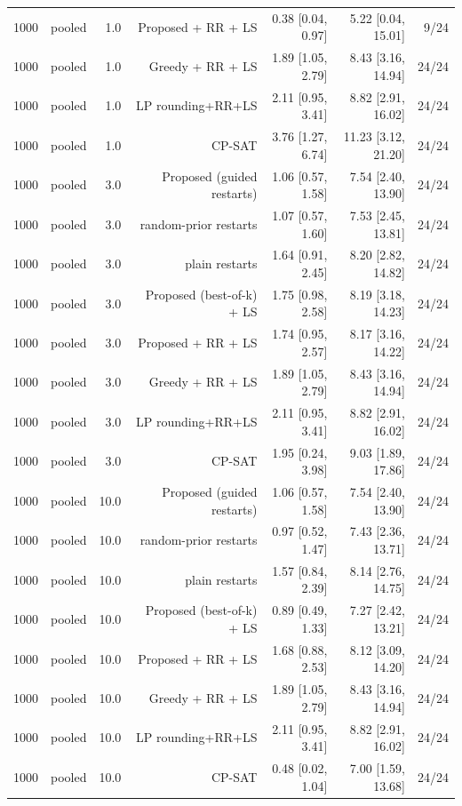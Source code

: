 \begin{table}[t]
\begin{tabular}{llrrrrr}
1000 & pooled & 1.0 & Proposed + RR + LS & 0.38 [0.04, 0.97] & 5.22 [0.04, 15.01] & 9/24 \\
1000 & pooled & 1.0 & Greedy + RR + LS & 1.89 [1.05, 2.79] & 8.43 [3.16, 14.94] & 24/24 \\
1000 & pooled & 1.0 & LP rounding+RR+LS & 2.11 [0.95, 3.41] & 8.82 [2.91, 16.02] & 24/24 \\
1000 & pooled & 1.0 & CP-SAT & 3.76 [1.27, 6.74] & 11.23 [3.12, 21.20] & 24/24 \\
1000 & pooled & 3.0 & Proposed (guided restarts) & 1.06 [0.57, 1.58] & 7.54 [2.40, 13.90] & 24/24 \\
1000 & pooled & 3.0 & random-prior restarts & 1.07 [0.57, 1.60] & 7.53 [2.45, 13.81] & 24/24 \\
1000 & pooled & 3.0 & plain restarts & 1.64 [0.91, 2.45] & 8.20 [2.82, 14.82] & 24/24 \\
1000 & pooled & 3.0 & Proposed (best-of-k) + LS & 1.75 [0.98, 2.58] & 8.19 [3.18, 14.23] & 24/24 \\
1000 & pooled & 3.0 & Proposed + RR + LS & 1.74 [0.95, 2.57] & 8.17 [3.16, 14.22] & 24/24 \\
1000 & pooled & 3.0 & Greedy + RR + LS & 1.89 [1.05, 2.79] & 8.43 [3.16, 14.94] & 24/24 \\
1000 & pooled & 3.0 & LP rounding+RR+LS & 2.11 [0.95, 3.41] & 8.82 [2.91, 16.02] & 24/24 \\
1000 & pooled & 3.0 & CP-SAT & 1.95 [0.24, 3.98] & 9.03 [1.89, 17.86] & 24/24 \\
1000 & pooled & 10.0 & Proposed (guided restarts) & 1.06 [0.57, 1.58] & 7.54 [2.40, 13.90] & 24/24 \\
1000 & pooled & 10.0 & random-prior restarts & 0.97 [0.52, 1.47] & 7.43 [2.36, 13.71] & 24/24 \\
1000 & pooled & 10.0 & plain restarts & 1.57 [0.84, 2.39] & 8.14 [2.76, 14.75] & 24/24 \\
1000 & pooled & 10.0 & Proposed (best-of-k) + LS & 0.89 [0.49, 1.33] & 7.27 [2.42, 13.21] & 24/24 \\
1000 & pooled & 10.0 & Proposed + RR + LS & 1.68 [0.88, 2.53] & 8.12 [3.09, 14.20] & 24/24 \\
1000 & pooled & 10.0 & Greedy + RR + LS & 1.89 [1.05, 2.79] & 8.43 [3.16, 14.94] & 24/24 \\
1000 & pooled & 10.0 & LP rounding+RR+LS & 2.11 [0.95, 3.41] & 8.82 [2.91, 16.02] & 24/24 \\
1000 & pooled & 10.0 & CP-SAT & 0.48 [0.02, 1.04] & 7.00 [1.59, 13.68] & 24/24 \\

\end{tabular}
\end{table}
